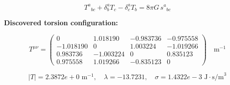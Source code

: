 
\begin{equation}
  T^a{}_{bc} + \delta^a_b T_c - \delta^a_c T_b = 8\pi G \, s^a{}_{bc}
\end{equation}

\textbf{Discovered torsion configuration:}

\begin{equation}
  T^{\mu\nu} = \begin{pmatrix}
    0 & 1.018190 & -0.983736 & -0.975558 \\
    -1.018190 & 0 & 1.003224 & -1.019266 \\
    0.983736 & -1.003224 & 0 & 0.835123 \\
    0.975558 & 1.019266 & -0.835123 & 0
  \end{pmatrix} \quad \text{m}^{-1}
\end{equation}

\begin{equation}
  |T| = 2.3872e+0 \text{ m}^{-1}, \quad
  \lambda = -13.7231, \quad
  \sigma = 1.4322e-3 \text{ J}\cdot\text{s/m}^3
\end{equation}